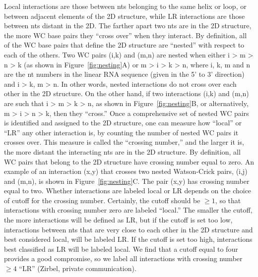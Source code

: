 Local interactions are those between nts belonging to the same helix or loop, or
between adjacent elements of the 2D structure, while LR interactions are those
between nts distant in the 2D. The farther apart two nts are in the 2D
structure, the more WC base pairs they ``cross over'' when they interact. By
definition, all of the WC base pairs that define the 2D structure are ``nested''
with respect to each of the others.  Two WC pairs (i,k) and (m,n) are nested
when either i \textgreater{} m \textgreater{} n \textgreater{} k (as shown in
Figure~\ref{fig:nesting}A) or m \textgreater{} i \textgreater{} k \textgreater{} n,
where i, k, m and n are the nt numbers in the linear RNA sequence (given in the
5’ to 3’ direction) and i \textgreater{} k, m \textgreater{} n. In other words,
nested interactions do not cross over each other in the 2D structure. On the
other hand, if two interactions (i,k) and (m,n) are such that i \textgreater{} m
\textgreater{} k \textgreater{} n, as shown in Figure~\ref{fig:nesting}B, or
alternatively, m \textgreater{} i \textgreater{} n \textgreater{} k, then they
``cross.'' Once a comprehensive set of nested WC pairs is identified and
assigned to the 2D structure, one can measure how ``local'' or ``LR'' any other
interaction is, by counting the number of nested WC pairs it crosses over. This
measure is called the “crossing number,” and the larger it is, the more distant
the interacting nts are in the 2D structure.  By definition, all WC pairs that
belong to the 2D structure have crossing number equal to zero. An example of an
interaction (x,y) that crosses two nested Watson-Crick pairs, (i,j) and (m,n),
is shown in Figure~\ref{fig:nesting}C. The pair (x,y) has crossing number equal
to two. Whether interactions are labeled local or LR depends on the choice of
cutoff for the crossing number. Certainly, the cutoff should be $\ge 1$, so that
interactions with crossing number zero are labeled ``local.'' The smaller the
cutoff, the more interactions will be defined as LR, but if the cutoff is set
too low, interactions between nts that are very close to each other in the 2D
structure and best considered local, will be labeled LR. If the cutoff is set
too high, interactions best classified as LR will be labeled local. We find that
a cutoff equal to four provides a good compromise, so we label all interactions
with crossing number $\ge 4$ ``LR'' (Zirbel, private communication). 

